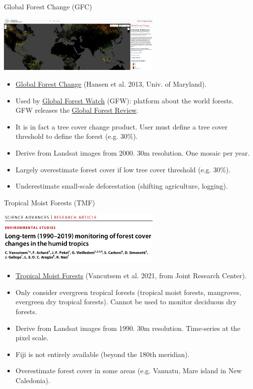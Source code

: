 \documentclass[10pt,table,dvipsnames,compress]{beamer}
\begin{document}
\begin{frame}[label={sec:org4e46164}]{Global Forest Change (GFC)}
\begin{center}
\includegraphics[width=8cm]{figs/fcc/gfc.png}
\end{center}

\begin{itemize}
\item \href{https://glad.earthengine.app/view/global-forest-change}{Global Forest Change} (Hansen et al. 2013, Univ. of Maryland).
\item Used by \href{https://www.globalforestwatch.org/}{Global Forest Watch} (GFW): platform about the world forests. GFW releases the \href{https://research.wri.org/gfr/global-forest-review}{Global Forest Review}.
\item It is in fact a tree cover change product. User must define a tree cover threshold to define the forest (e.g. 30\%).
\item Derive from Landsat images from 2000. 30m resolution. One mosaic per year.
\item Largely overestimate forest cover if low tree cover threshold (e.g. 30\%).
\item Underestimate small-scale deforestation (shifting agriculture, logging).
\end{itemize}
\end{frame}

\begin{frame}[label={sec:org5042f65}]{Tropical Moist Forests (TMF)}
\begin{center}
\includegraphics[width=8cm]{figs/fcc/Vancutsem2021.png}
\end{center}

\begin{itemize}
\item \href{https://forobs.jrc.ec.europa.eu/TMF}{Tropical Moist Forests} (Vancutsem et al. 2021, from Joint Research Center).
\item Only consider evergreen tropical forests (tropical moist forests, mangroves, evergreen dry tropical forests). Cannot be used to monitor deciduous dry forests.
\item Derive from Landsat images from 1990. 30m resolution. Time-series at the pixel scale.
\item Fiji is not entirely available (beyond the 180th meridian).
\item Overestimate forest cover in some areas (e.g. Vanuatu, Mare island in New Caledonia).
\end{itemize}
\end{frame}
\end{document}
